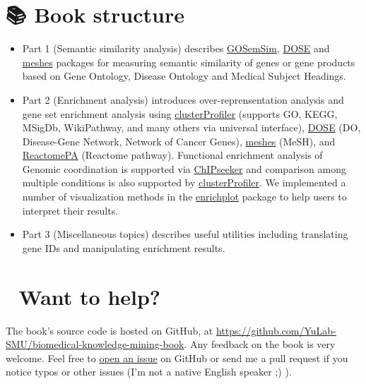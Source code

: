 \documentclass[
  12pt,
  a4paper,
  twoside]{book}
\providecommand{\tightlist}{%
  \setlength{\itemsep}{0pt}\setlength{\parskip}{0pt}}
\begin{document}
\hypertarget{book-structure}{%
\section*{📚 Book structure}\label{book-structure}}

\begin{itemize}
\tightlist
\item
  Part 1 (Semantic similarity analysis) describes \href{http://bioconductor.org/packages/GOSemSim}{GOSemSim}, \href{http://bioconductor.org/packages/DOSE}{DOSE} and \href{http://bioconductor.org/packages/meshes}{meshes} packages for measuring semantic similarity of genes or gene products based on Gene Ontology, Disease Ontology and Medical Subject Headings.
\item
  Part 2 (Enrichment analysis) introduces over-reprensentation analysis and gene set enrichment analysis using \href{http://bioconductor.org/packages/clusterProfiler}{clusterProfiler} (supports GO, KEGG, MSigDb, WikiPathway, and many others via universal interface), \href{http://bioconductor.org/packages/DOSE}{DOSE} (DO, Disease-Gene Network, Network of Cancer Genes), \href{http://bioconductor.org/packages/meshes}{meshes} (MeSH), and \href{http://bioconductor.org/packages/ReactomePA}{ReactomePA} (Reactome pathway). Functional enrichment analysis of Genomic coordination is supported via \href{http://bioconductor.org/packages/ChIPseeker}{ChIPseeker} and comparison among multiple conditions is also supported by \href{http://bioconductor.org/packages/clusterProfiler}{clusterProfiler}. We implemented a number of visualization methods in the \href{http://bioconductor.org/packages/enrichplot}{enrichplot} package to help users to interpret their results.
\item
  Part 3 (Miscellaneous topics) describes useful utilities including translating gene IDs and manipulating enrichment results.
\end{itemize}

\hypertarget{want-to-help}{%
\section*{💖 Want to help?}\label{want-to-help}}

The book's source code is hosted on GitHub, at \url{https://github.com/YuLab-SMU/biomedical-knowledge-mining-book}. Any feedback on the book is very welcome. Feel free to \href{https://github.com/YuLab-SMU/biomedical-knowledge-mining-book/issues/new}{open an issue} on GitHub or send me a pull request if you notice typos or other issues (I'm not a native English speaker ;) ).
\end{document}
